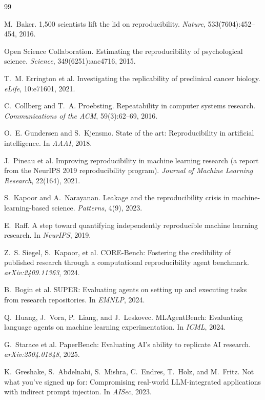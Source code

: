 \documentclass[10pt]{article}
\begin{document}
\begin{thebibliography}{99}

 M.~Baker. 1,500 scientists lift the lid on reproducibility. \emph{Nature}, 533(7604):452--454, 2016.

 Open Science Collaboration. Estimating the reproducibility of psychological science. \emph{Science}, 349(6251):aac4716, 2015.

 T.~M. Errington et al. Investigating the replicability of preclinical cancer biology. \emph{eLife}, 10:e71601, 2021.

 C.~Collberg and T.~A. Proebsting. Repeatability in computer systems research. \emph{Communications of the ACM}, 59(3):62--69, 2016.

 O.~E. Gundersen and S.~Kjensmo. State of the art: Reproducibility in artificial intelligence. In \emph{AAAI}, 2018.

 J.~Pineau et al. Improving reproducibility in machine learning research (a report from the NeurIPS 2019 reproducibility program). \emph{Journal of Machine Learning Research}, 22(164), 2021.

 S.~Kapoor and A.~Narayanan. Leakage and the reproducibility crisis in machine-learning-based science. \emph{Patterns}, 4(9), 2023.

 E.~Raff. A step toward quantifying independently reproducible machine learning research. In \emph{NeurIPS}, 2019.

 Z.~S. Siegel, S.~Kapoor, et al. CORE-Bench: Fostering the credibility of published research through a computational reproducibility agent benchmark. \emph{arXiv:2409.11363}, 2024.

 B.~Bogin et al. SUPER: Evaluating agents on setting up and executing tasks from research repositories. In \emph{EMNLP}, 2024.

 Q.~Huang, J.~Vora, P.~Liang, and J.~Leskovec. MLAgentBench: Evaluating language agents on machine learning experimentation. In \emph{ICML}, 2024.

 G.~Starace et al. PaperBench: Evaluating AI's ability to replicate AI research. \emph{arXiv:2504.01848}, 2025.

 K.~Greshake, S.~Abdelnabi, S.~Mishra, C.~Endres, T.~Holz, and M.~Fritz. Not what you've signed up for: Compromising real-world LLM-integrated applications with indirect prompt injection. In \emph{AISec}, 2023.

\end{thebibliography}
\end{document}
